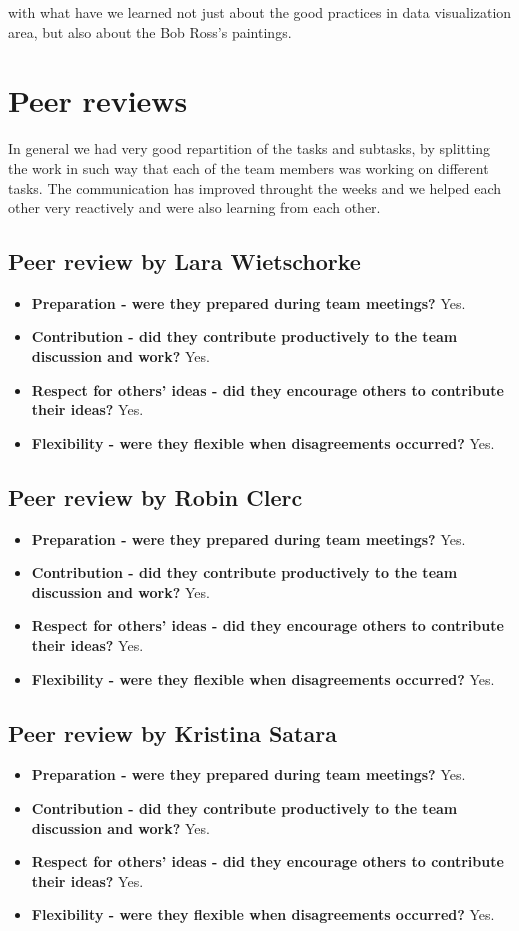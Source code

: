 \documentclass[a4paper]{tufte-book}
\begin{document}
 with what have we learned not just about the good practices in data visualization area, but also about the Bob Ross's paintings. \\


\chapter{Peer reviews}
In general we had very good repartition of the tasks and subtasks, by splitting the work in such way that each of the team members was working on different tasks. The communication has improved throught the weeks and we helped each other very reactively and were also learning from each other. 

\section{Peer review by Lara Wietschorke}
\begin{itemize}
\item \textbf{Preparation - were they prepared during team meetings?} Yes.
\item \textbf{Contribution - did they contribute productively to the team discussion and work?} Yes.
\item \textbf{Respect for others' ideas - did they encourage others to contribute their ideas?} Yes.
\item \textbf{Flexibility - were they flexible when disagreements occurred?} Yes.
\end{itemize}

\section{Peer review by Robin Clerc}
\begin{itemize}
\item \textbf{Preparation - were they prepared during team meetings?} Yes.
\item \textbf{Contribution - did they contribute productively to the team discussion and work?} Yes.
\item \textbf{Respect for others' ideas - did they encourage others to contribute their ideas?} Yes.
\item \textbf{Flexibility - were they flexible when disagreements occurred?} Yes.
\end{itemize}

\section{Peer review by Kristina Satara}
\begin{itemize}
\item \textbf{Preparation - were they prepared during team meetings?} Yes.
\item \textbf{Contribution - did they contribute productively to the team discussion and work?} Yes.
\item \textbf{Respect for others' ideas - did they encourage others to contribute their ideas?} Yes.
\item \textbf{Flexibility - were they flexible when disagreements occurred?} Yes.
\end{itemize}


\backmatter





\printindex
\end{document}
